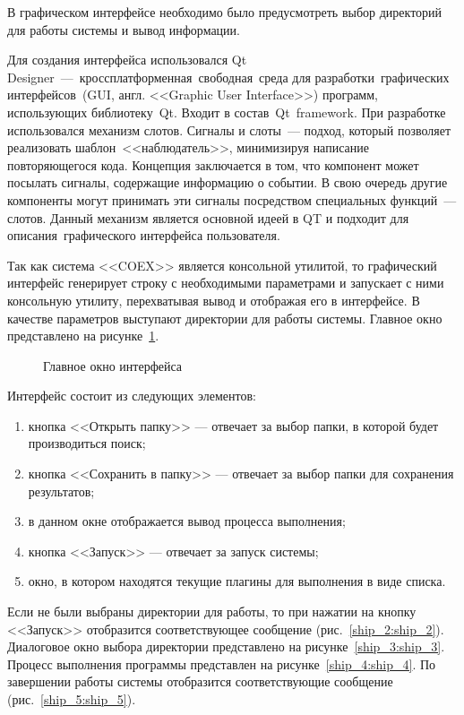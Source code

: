 В графическом интерфейсе необходимо было предусмотреть выбор директорий для работы системы и вывод информации.

Для создания интерфейса использовался Qt Designer --- кроссплатформенная свободная среда для разработки графических интерфейсов (GUI, англ. <<Graphic User Interface>>) программ, использующих библиотеку Qt. Входит в состав Qt framework. При разработке использовался механизм слотов. Сигналы и слоты --- подход, который позволяет реализовать шаблон <<наблюдатель>>, минимизируя написание повторяющегося кода. Концепция заключается в том, что компонент может посылать сигналы, содержащие информацию о событии. В свою очередь другие компоненты могут принимать эти сигналы посредством специальных функций --- слотов. Данный механизм является основной идеей в QT и подходит для описания графического интерфейса пользователя.

Так как система <<COEX>> является консольной утилитой, то графический интерфейс генерирует строку с необходимыми параметрами и запускает с ними консольную утилиту, перехватывая вывод и отображая его в интерфейсе. В качестве параметров выступают директории для работы системы. Главное окно представлено на рисунке~\ref{ship_1:ship_1}.

\begin{figure}[h!]
\caption{ Главное окно интерфейса }
\label{ship_1:ship_1}
\end{figure}

Интерфейс состоит из следующих элементов:
\begin{enumerate}
  \item кнопка <<Открыть папку>> --- отвечает за выбор папки, в которой будет производиться поиск;
  \item кнопка <<Сохранить в папку>> --- отвечает за выбор папки для сохранения результатов; 
  \item в данном окне отображается вывод процесса выполнения;
  \item кнопка <<Запуск>> --- отвечает за запуск системы;
  \item окно, в котором находятся текущие плагины для выполнения в виде списка. 
\end{enumerate}

Если не были выбраны директории для работы, то при нажатии на кнопку <<Запуск>> отобразится соответствующее сообщение (рис.~\ref{ship_2:ship_2}). Диалоговое окно выбора директории представлено на рисунке~\ref{ship_3:ship_3}. Процесс выполнения программы представлен на рисунке~\ref{ship_4:ship_4}. По завершении работы системы отобразится соответствующие сообщение (рис.~\ref{ship_5:ship_5}).

